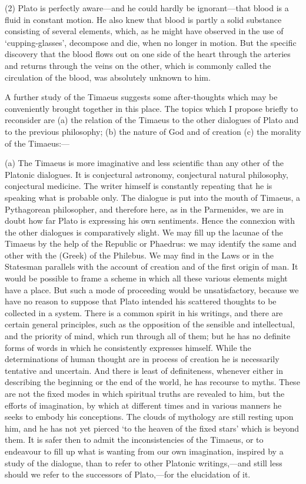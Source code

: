 \documentclass[11pt,letter]{article}
\begin{document}
\par  (2) Plato is perfectly aware—and he could hardly be ignorant—that blood is a fluid in constant motion. He also knew that blood is partly a solid substance consisting of several elements, which, as he might have observed in the use of ‘cupping-glasses’, decompose and die, when no longer in motion. But the specific discovery that the blood flows out on one side of the heart through the arteries and returns through the veins on the other, which is commonly called the circulation of the blood, was absolutely unknown to him.

\par  A further study of the Timaeus suggests some after-thoughts which may be conveniently brought together in this place. The topics which I propose briefly to reconsider are (a) the relation of the Timaeus to the other dialogues of Plato and to the previous philosophy; (b) the nature of God and of creation (c) the morality of the Timaeus:—

\par  (a) The Timaeus is more imaginative and less scientific than any other of the Platonic dialogues. It is conjectural astronomy, conjectural natural philosophy, conjectural medicine. The writer himself is constantly repeating that he is speaking what is probable only. The dialogue is put into the mouth of Timaeus, a Pythagorean philosopher, and therefore here, as in the Parmenides, we are in doubt how far Plato is expressing his own sentiments. Hence the connexion with the other dialogues is comparatively slight. We may fill up the lacunae of the Timaeus by the help of the Republic or Phaedrus: we may identify the same and other with the (Greek) of the Philebus. We may find in the Laws or in the Statesman parallels with the account of creation and of the first origin of man. It would be possible to frame a scheme in which all these various elements might have a place. But such a mode of proceeding would be unsatisfactory, because we have no reason to suppose that Plato intended his scattered thoughts to be collected in a system. There is a common spirit in his writings, and there are certain general principles, such as the opposition of the sensible and intellectual, and the priority of mind, which run through all of them; but he has no definite forms of words in which he consistently expresses himself. While the determinations of human thought are in process of creation he is necessarily tentative and uncertain. And there is least of definiteness, whenever either in describing the beginning or the end of the world, he has recourse to myths. These are not the fixed modes in which spiritual truths are revealed to him, but the efforts of imagination, by which at different times and in various manners he seeks to embody his conceptions. The clouds of mythology are still resting upon him, and he has not yet pierced ‘to the heaven of the fixed stars’ which is beyond them. It is safer then to admit the inconsistencies of the Timaeus, or to endeavour to fill up what is wanting from our own imagination, inspired by a study of the dialogue, than to refer to other Platonic writings,—and still less should we refer to the successors of Plato,—for the elucidation of it.
\end{document}
